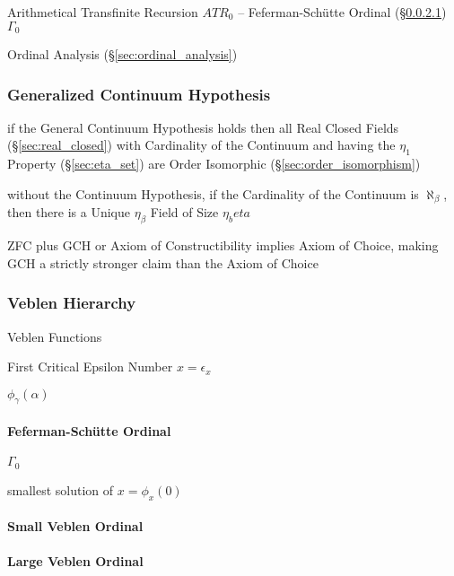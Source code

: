 Arithmetical Transfinite Recursion $ATR_0$ -- Feferman-Sch\"utte
Ordinal (\S\ref{sec:feferman_schutte}) $\Gamma_0$

Ordinal Analysis (\S\ref{sec:ordinal_analysis})



\subsubsection{Generalized Continuum Hypothesis}
\label{sec:generalized_continuum}

if the General Continuum Hypothesis holds then all Real Closed Fields
(\S\ref{sec:real_closed}) with Cardinality of the Continuum and having the
$\eta_1$ Property (\S\ref{sec:eta_set}) are Order Isomorphic
(\S\ref{sec:order_isomorphism})

without the Continuum Hypothesis, if the Cardinality of the Continuum is
$\aleph_\beta$, then there is a Unique $\eta_\beta$ Field of Size $\eta_beta$

ZFC plus GCH or Axiom of Constructibility implies Axiom of Choice, making GCH a
strictly stronger claim than the Axiom of Choice



\subsubsection{Veblen Hierarchy}\label{sec:veblen_hierarchy}

Veblen Functions %

First Critical Epsilon Number $x = \epsilon_x$ %

$\phi_\gamma(\alpha)$



\paragraph{Feferman-Sch\"utte Ordinal}\label{sec:feferman_schutte}\hfill

$\Gamma_0$

smallest solution of $x = \phi_x(0)$



\paragraph{Small Veblen Ordinal}\label{sec:small_veblen}\hfill

\paragraph{Large Veblen Ordinal}\label{sec:large_veblen}\hfill



